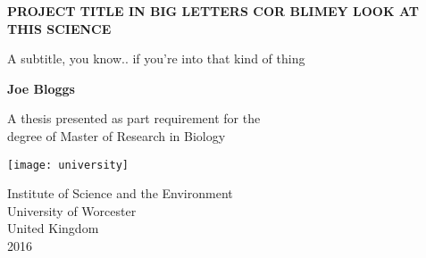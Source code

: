 \begin{titlepage}
    \begin{center}
        \vspace*{1cm}
        
        \Large
        \textbf{PROJECT TITLE IN BIG LETTERS COR BLIMEY LOOK AT THIS SCIENCE}
        
        \vspace{0.5cm}
        \large
       A subtitle, you know.. if you're into that kind of thing
        
        \vspace{1.5cm}
        
        \textbf{Joe Bloggs}
        
        \vfill
        
        A thesis presented as part requirement for the\\
        degree of Master of Research in Biology
        
        \vspace{0.8cm}
        
        \texttt{[image: university]}
        
        \Large
        Institute of Science and the Environment\\
        University of Worcester\\
        United Kingdom\\
        2016
        
    \end{center}
\end{titlepage}